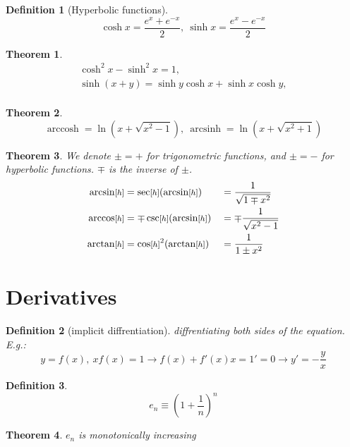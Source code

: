 \documentclass[]{article}
\newtheorem{theorem}{Theorem}[section]
\newtheorem{definition}{Definition}[section]
\newcommand\sinhx {\sinh x}
\newcommand\coshx {\cosh x}
\DeclareMathOperator{\arccosh}{arccosh}
\DeclareMathOperator{\arcsinh}{arcsinh}
\newcommand\h     {\text{\!\footnotesize$[h]$\normalsize}}
\newcommand\cl [1]    {\left ( #1 \right )}
\begin{document}
\begin{multicols}{2}
		\begin{definition}[Hyperbolic functions]
			\[ \coshx = \frac{e^x + e^{-x}}{2}, \ \sinhx = \frac{e^x - e^{-x}}{2} \]
		\end{definition}
		
		\begin{theorem}
			\begin{gather*}
				\cosh^2x - \sinh^2x = 1, \\
				\sinh(x + y) = \sinh y \coshx + \sinhx \cosh y, \\ 
			\end{gather*}
		\end{theorem}
		
		\begin{theorem}
			\[ \arccosh = \ln(x + \sqrt{x^2 - 1}), \ \arcsinh = \ln(x + \sqrt{x^2 + 1}) \]
		\end{theorem}
		
		\begin{theorem}
			We denote $\pm = +$ for trigonometric functions, and $\pm = -$ for hyperbolic functions. $\mp$ is the inverse of $\pm$.
			\begin{alignat*}{9}
				\arcsin\h &= \sec\h(\arcsin\h) &&= \frac{1}{\sqrt{1 \mp x^2}} \\
				\arccos\h &= \mp\csc\h(\arcsin\h) &&= \mp \frac{1}{\sqrt{x^2 - 1}} \\
				\arctan\h &= \cos\h^2(\arctan\h) &&= \frac{1}{1 \pm x^2}
			\end{alignat*}
		\end{theorem}
		
		
		
		\section{Derivatives}
		
		\begin{definition}[implicit diffrentiation]
			diffrentiating both sides of the equation. E.g.: 
			\[ y = f(x), \ xf(x) = 1 \to f(x) + f'(x)x = 1' = 0 \to y' = -\frac{y}{x} \]
		\end{definition}
		
		\begin{definition}
			\[ e_n \equiv \cl{1 + \frac{1}{n}}^n \]
		\end{definition}
		
		\begin{theorem}
			$e_n$ is monotonically increasing
		\end{theorem}
		

\end{multicols}
\end{document}
